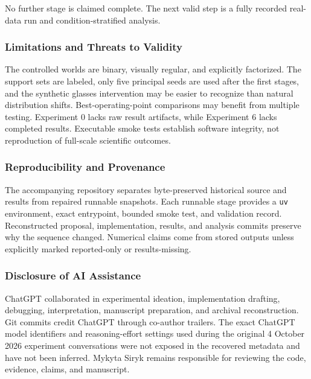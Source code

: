 \documentclass[
  10pt,
]{article}
\begin{document}
No further stage is claimed complete. The next valid step is a fully
recorded real-data run and condition-stratified analysis.

\hypertarget{limitations-and-threats-to-validity}{%
\subsubsection{Limitations and Threats to
Validity}\label{limitations-and-threats-to-validity}}

The controlled worlds are binary, visually regular, and explicitly
factorized. The support sets are labeled, only five principal seeds are
used after the first stages, and the synthetic glasses intervention may
be easier to recognize than natural distribution shifts.
Best-operating-point comparisons may benefit from multiple testing.
Experiment 0 lacks raw result artifacts, while Experiment 6 lacks
completed results. Executable smoke tests establish software integrity,
not reproduction of full-scale scientific outcomes.

\hypertarget{reproducibility-and-provenance}{%
\subsubsection{Reproducibility and
Provenance}\label{reproducibility-and-provenance}}

The accompanying repository separates byte-preserved historical source
and results from repaired runnable snapshots. Each runnable stage
provides a \texttt{uv} environment, exact entrypoint, bounded smoke
test, and validation record. Reconstructed proposal, implementation,
results, and analysis commits preserve why the sequence changed.
Numerical claims come from stored outputs unless explicitly marked
reported-only or results-missing.

\hypertarget{disclosure-of-ai-assistance}{%
\subsubsection{Disclosure of AI
Assistance}\label{disclosure-of-ai-assistance}}

ChatGPT collaborated in experimental ideation, implementation drafting,
debugging, interpretation, manuscript preparation, and archival
reconstruction. Git commits credit ChatGPT through co-author trailers.
The exact ChatGPT model identifiers and reasoning-effort settings used
during the original 4 October 2026 experiment conversations were not
exposed in the recovered metadata and have not been inferred. Mykyta
Siryk remains responsible for reviewing the code, evidence, claims, and
manuscript.
\end{document}
